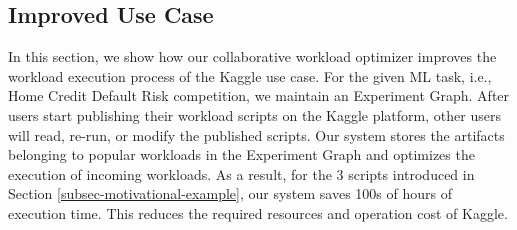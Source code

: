 
\subsection{Improved Use Case}
In this section, we show how our collaborative workload optimizer improves the workload execution process of the Kaggle use case.
For the given ML task, i.e., Home Credit Default Risk competition, we maintain an Experiment Graph.
After users start publishing their workload scripts on the Kaggle platform, other users will read, re-run, or modify the published scripts.
Our system stores the artifacts belonging to popular workloads in the Experiment Graph and optimizes the execution of incoming workloads.
As a result, for the 3 scripts introduced in Section \ref{subsec-motivational-example}, our system saves 100s of hours of execution time.
This reduces the required resources and operation cost of Kaggle.
